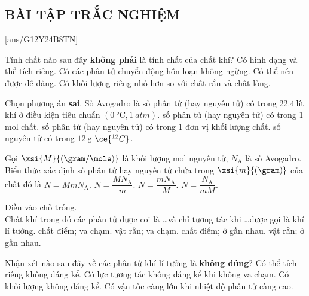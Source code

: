 \subsection{BÀI TẬP TRẮC NGHIỆM}
[ans/G12Y24B8TN]
\begin{ex}
	Tính chất nào sau đây \textbf{không phải} là tính chất của chất khí?
	\choice
	{\True Có hình dạng và thể tích riêng.}
	{Có các phân tử chuyển động hỗn loạn không ngừng.}
	{Có thể nén được dễ dàng.}
	{Có khối lượng riêng nhỏ hơn so với chất rắn và chất lỏng.}
	\loigiai{}
\end{ex}
\begin{ex}
	Chọn phương án \textbf{sai}. Số Avogadro là
	\choice
	{số phân tử (hay nguyên tử) có trong $\SI{22.4}{\text{lít}}$ khí ở điều kiện tiêu chuẩn $\left(\SI{0}{\celsius}, \SI{1}{atm}\right)$.}
	{số phân tử (hay nguyên tử) có trong 1 mol chất.}
	{\True số phân tử (hay nguyên tử) có trong 1 đơn vị khối lượng chất.}
	{số nguyên tử có trong $\SI{12}{\gram}$ $\ce{^{12}C}$.}
	\loigiai{}
\end{ex}
\begin{ex}
Gọi $\xsi{M}{(\gram/\mole)}$ là khối lượng mol nguyên tử, $N_\text{A}$ là số Avogadro. Biểu thức xác định số phân tử hay nguyên tử chứa trong $\xsi{m}{(\gram)}$ của chất đó là	
	\choice
	{$N=MmN_\text{A}$.}
	{$N=\dfrac{MN_\text{A}}{m}$.}
	{\True $N=\dfrac{mN_\text{A}}{M}$.}
	{$N=\dfrac{N_\text{A}}{mM}$.}
	\loigiai{}
\end{ex}
\begin{ex}
Điền vào chỗ trống.\\
Chất khí trong đó các phân tử được coi là \dots và chỉ tương tác khi \dots được gọi là khí lí tưởng.	
	\choice
	{\True chất điểm; va chạm.}
	{vật rắn; va chạm.}
	{chất điểm; ở gần nhau.}
	{vật rắn; ở gần nhau.}
	\loigiai{}
\end{ex}
\begin{ex}
	Nhận xét nào sau đây về các phân tử khí lí tưởng là \textbf{không đúng}?
	\choice
	{Có thể tích riêng không đáng kể.}
	{Có lực tương tác không đáng kể khi không va chạm.}
	{\True Có khối lượng không đáng kể.}
	{Có vận tốc càng lớn khi nhiệt độ phân tử càng cao.}
	\loigiai{}
\end{ex}
